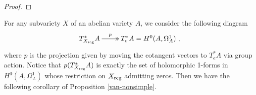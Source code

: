 \documentclass[a4paper,12pt,reqno]{amsart}
\theoremstyle{plain}
\theoremstyle{remark}
\begin{document}
\begin{proof}
%
%

\end{proof}

For any subvariety $X$ of an abelian variety $A$, we consider the following diagram 
$$\xymatrix{
T^*_{X_{\textnormal{reg}}}A\ar@{->>}[r]^-p& T^*_e A=H^0(A, \Omega_A^1)
},$$ where $p$ is the projection given by moving the cotangent vectors to $T^*_eA$ via group action. Notice that $p(T^*_{X_{\textnormal{reg}}}A)$ is exactly the set of holomorphic 1-forms in $H^0(A, \Omega_A^1)$ whose restriction on $X_{\textnormal{reg}}$ admitting zeros. Then we have the following corollary of Proposition \ref{van-nonsimple}.
\end{document}
